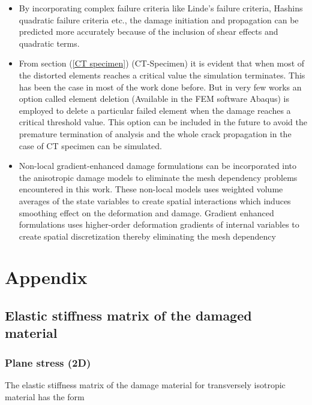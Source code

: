 \documentclass[12pt,twoside]{report}
\newcounter{savepage}
\begin{document}
\begin{itemize}
\item By incorporating complex failure criteria like Linde's failure criteria, Hashins quadratic failure criteria etc., the damage initiation and propagation can be predicted more accurately because of the inclusion of shear effects and quadratic terms.

\item From section (\ref{CT specimen}) (CT-Specimen) it is evident that when most of the distorted elements reaches a critical value the simulation terminates. This has been the case in most of the work done before. But in very few works an option called element deletion (Available in the FEM software Abaqus) is employed to delete a particular failed element when the damage reaches a critical threshold value. This option can be included in the future to avoid the premature termination of analysis and the whole crack propagation in the case of CT specimen can be simulated.

\item Non-local gradient-enhanced damage formulations can be incorporated into the anisotropic damage models to eliminate the mesh dependency problems encountered in this work.  These non-local models uses weighted volume averages of the state variables to create spatial interactions which induces smoothing effect on the deformation and damage.  Gradient enhanced formulations uses higher-order deformation gradients of internal variables to create spatial discretization thereby eliminating the mesh dependency


\end{itemize}



\clearpage
{}
\chapter*{Appendix}
\renewcommand{\thesection}{\Alph{section}.\arabic{section}}
\setcounter{page}{\thesavepage}
\section{Elastic stiffness matrix of the damaged material}
\subsection{Plane stress (2D)}
\indent\indent\indent The elastic stiffness matrix of the damage material for transversely isotropic material has the form \\
\end{document}
